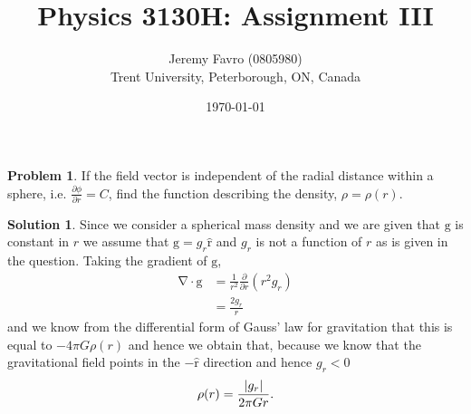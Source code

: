 \documentclass[10pt]{article}
\title{Physics 3130H: Assignment III}
\author{Jeremy Favro (0805980) \\ Trent University, Peterborough, ON, Canada}
\date{\today}
\theoremstyle{definition}
\newtheorem{problem}{Problem}
\newtheorem{soln}{Solution}
\newcommand{\uv}[1]{\hat{\bv{{#1}}}}
\newcommand{\bv}[1]{\bm{\mathrm{#1}}}
\begin{document}
\maketitle

\begin{problem}
If the field vector is independent of the radial distance within a sphere, i.e. $\frac{\partial \phi}{\partial r}=C$, find
the function describing the density, $\rho=\rho(r)$.
\end{problem}
\begin{soln}
  Since we consider a spherical mass density and we are given that $\bv{g}$ is constant in $r$ we assume that $\bv{g}=g_r\uv{r}$ and $g_r$ is not a function of $r$ as is given in the question.
  Taking the gradient of $\bv{g}$,
  \begin{align*}
    \bv{\nabla}\cdot\bv{g} & =\frac{1}{r^2}\frac{\partial}{\partial r}\left(r^2 g_r\right) \\
                           & =\frac{2g_r}{r}
  \end{align*}
  and we know from the differential form of Gauss' law for gravitation that this is equal to $-4\pi G\rho(r)$
  and hence we obtain that, because we know that the gravitational field points in the $-\uv{r}$ direction and hence $g_r<0$
  $$\rho(r)=\frac{\abs{g_r}}{2\pi Gr}.$$
\end{soln}
\end{document}
